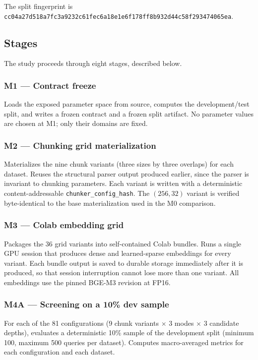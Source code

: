 \documentclass[11pt,a4paper]{article}
\begin{document}
The split fingerprint is
\texttt{cc04a27d518a7fc3a9232c61fec6a18e1e6f178ff8b932d44c58f293474065ea}.

\subsection{Stages}
The study proceeds through eight stages, described below.

\subsubsection{M1 --- Contract freeze}
Loads the exposed parameter space from source, computes the
development/test split, and writes a frozen contract and a frozen
split artifact. No parameter values are chosen at M1; only their
domains are fixed.

\subsubsection{M2 --- Chunking grid materialization}
Materializes the nine chunk variants (three sizes by three overlaps)
for each dataset. Reuses the structural parser output produced
earlier, since the parser is invariant to chunking parameters. Each
variant is written with a deterministic content-addressable
\texttt{chunker\_config\_hash}. The $(256, 32)$ variant is verified
byte-identical to the base materialization used in the M0
comparison.

\subsubsection{M3 --- Colab embedding grid}
Packages the \num{36} grid variants into self-contained Colab
bundles. Runs a single GPU session that produces dense and
learned-sparse embeddings for every variant. Each bundle output is
saved to durable storage immediately after it is produced, so that
session interruption cannot lose more than one variant. All
embeddings use the pinned BGE-M3 revision at FP16.

\subsubsection{M4A --- Screening on a 10\% dev sample}
For each of the \num{81} configurations
(\num{9} chunk variants $\times$ \num{3} modes $\times$ \num{3}
candidate depths), evaluates a deterministic 10\% sample of the
development split (minimum \num{100}, maximum \num{500} queries per
dataset). Computes macro-averaged metrics for each configuration and
each dataset.
\end{document}
